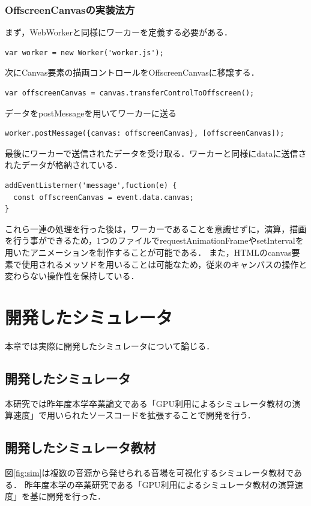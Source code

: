 \documentclass[a4j,12pt]{jsarticle}
\begin{document}
\subsubsection{OffscreenCanvasの実装法方}
まず，WebWorkerと同様にワーカーを定義する必要がある．
\begin{lstlisting}[basicstyle=\ttfamily\footnotesize, frame=single]
var worker = new Worker('worker.js');
 \end{lstlisting}
 
 次にCanvas要素の描画コントロールをOffscreenCanvasに移譲する．
 \begin{lstlisting}[basicstyle=\ttfamily\footnotesize, frame=single]
var offscreenCanvas = canvas.transferControlToOffscreen();
 \end{lstlisting}
 
 データをpostMessageを用いてワーカーに送る
 \begin{lstlisting}[basicstyle=\ttfamily\footnotesize, frame=single]
worker.postMessage({canvas: offscreenCanvas}, [offscreenCanvas]);
 \end{lstlisting}
 
 最後にワーカーで送信されたデータを受け取る．ワーカーと同様にdataに送信されたデータが格納されている．
  \begin{lstlisting}[basicstyle=\ttfamily\footnotesize, frame=single]
 addEventListerner('message',fuction(e) { 
  const offscreenCanvas = event.data.canvas;
}
 \end{lstlisting} 
これら一連の処理を行った後は，ワーカーであることを意識せずに，演算，描画を行う事ができるため，1つのファイルでrequestAnimationFrameやsetIntervalを用いたアニメーションを制作することが可能である．
また，HTMLのcanvas要素で使用されるメッソドを用いることは可能なため，従来のキャンバスの操作と変わらない操作性を保持している．

\newpage
\section{開発したシミュレータ}
\label{sec:kaihatsu}
本章では実際に開発したシミュレータについて論じる．
\subsection{開発したシミュレータ}
本研究では昨年度本学卒業論文である「GPU利用によるシミュレータ教材の演算速度」で用いられたソースコードを拡張することで開発を行う．

\subsection{開発したシミュレータ教材}
図\ref{fig:sim}は複数の音源から発せられる音場を可視化するシミュレータ教材である．
昨年度本学の卒業研究である「GPU利用によるシミュレータ教材の演算速度」を基に開発を行った．
\end{document}
